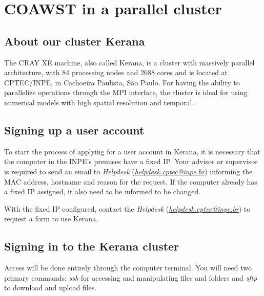 
\chapter{COAWST in a parallel cluster}
\bigskip

\section{About our cluster Kerana}
\bigskip

\noindent The CRAY XE machine, also called Kerana, is a cluster with massively parallel architecture, with 84 processing nodes and 2688 cores and is located at CPTEC/INPE,
in Cachoeira Paulista, São Paulo. For having the ability to parallelize operations through the MPI interface, the cluster is ideal for using numerical models with high spatial resolution
and temporal.
\bigskip

\section{Signing up a user account}
\bigskip

\noindent To start the process of applying for a user account in Kerana, it is necessary that the computer in the INPE's premises have a fixed IP. Your advisor or supervisor 
is required to send an email to \textit{Helpdesk} (\textcolor{bleu_cite}{\href{helpdesk.cptec@inpe.br}{\textit{helpdesk.cptec@inpe.br}}}) informing the MAC address, hostname
and reason for the request. If the computer already has a fixed IP assigned, it also need to be informed to be changed.
\bigskip

\noindent With the fixed IP configured, contact the \textit{Helpdesk} (\textcolor{bleu_cite}{\href{helpdesk.cptec@inpe.br}{\textit{helpdesk.cptec@inpe.br}}}) to request a form 
to use Kerana.
\bigskip

\section{Signing in to the Kerana cluster}\label{keranaacess}
\bigskip

\noindent Access will be done entirely through the computer terminal. You will need two primary commands: \textit{ssh} for accessing and manipulating files and folders and 
\textit{sftp} to download and upload files.
\bigskip

